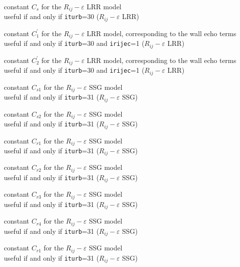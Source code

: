 {constant $C_s$ for the $R_{ij}-\varepsilon$ LRR model\\
useful if and only if {\tt iturb}=30
($R_{ij}-\varepsilon$ LRR)}

{constant $C_1^\prime$ for the $R_{ij}-\varepsilon$ LRR model, corresponding to
the wall echo terms\\
useful if and only if {\tt iturb}=30
and {\tt irijec}=1
($R_{ij}-\varepsilon$ LRR)}

{constant $C_2^\prime$ for the $R_{ij}-\varepsilon$ LRR model, corresponding to
the wall echo terms\\
useful if and only if {\tt iturb}=30 and {\tt irijec}=1
($R_{ij}-\varepsilon$ LRR)}


{constant $C_{s1}$ for the $R_{ij}-\varepsilon$ SSG model\\
useful if and only if {\tt iturb}=31
($R_{ij}-\varepsilon$ SSG)}

{constant $C_{s2}$ for the $R_{ij}-\varepsilon$ SSG model\\
useful if and only if {\tt iturb}=31
($R_{ij}-\varepsilon$ SSG)}

{constant $C_{r1}$ for the $R_{ij}-\varepsilon$ SSG model\\
useful if and only if {\tt iturb}=31
($R_{ij}-\varepsilon$ SSG)}

{constant $C_{r2}$ for the $R_{ij}-\varepsilon$ SSG model\\
useful if and only if {\tt iturb}=31
($R_{ij}-\varepsilon$ SSG)}

{constant $C_{r3}$ for the $R_{ij}-\varepsilon$ SSG model\\
useful if and only if {\tt iturb}=31
($R_{ij}-\varepsilon$ SSG)}

{constant $C_{r4}$ for the $R_{ij}-\varepsilon$ SSG model\\
useful if and only if {\tt iturb}=31
($R_{ij}-\varepsilon$ SSG)}

{constant $C_{r1}$ for the $R_{ij}-\varepsilon$ SSG model\\
useful if and only if {\tt iturb}=31
($R_{ij}-\varepsilon$ SSG)}


